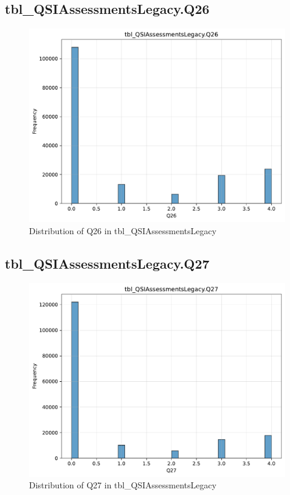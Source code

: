 \subsection{tbl\_QSIAssessmentsLegacy.Q26}

\begin{figure}[htbp]
\centering
\includegraphics[width=\textwidth]{figures/dbo_tbl_QSIAssessmentsLegacy_Q26.pdf}
\caption{Distribution of Q26 in tbl\_QSIAssessmentsLegacy}
\end{figure}\newpage

\subsection{tbl\_QSIAssessmentsLegacy.Q27}

\begin{figure}[htbp]
\centering
\includegraphics[width=\textwidth]{figures/dbo_tbl_QSIAssessmentsLegacy_Q27.pdf}
\caption{Distribution of Q27 in tbl\_QSIAssessmentsLegacy}
\end{figure}\newpage

